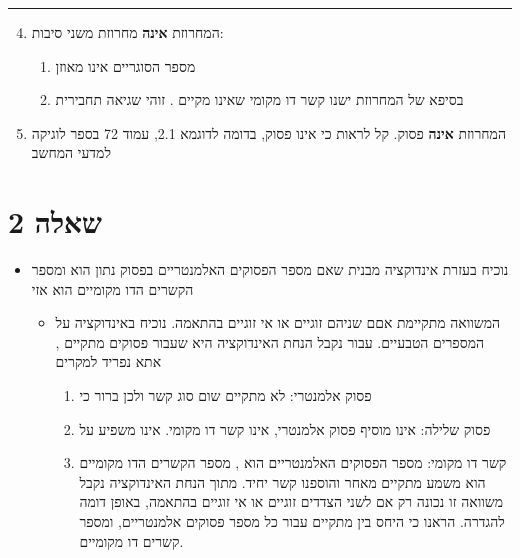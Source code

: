 \documentclass[
]{article}
\providecommand{\tightlist}{%
  \setlength{\itemsep}{0pt}\setlength{\parskip}{0pt}}
\begin{document}
\begin{center}\rule{0.5\linewidth}{0.5pt}\end{center}

\begin{enumerate}
\setcounter{enumi}{3}
\tightlist
\item
  המחרוזת {} \textbf{אינה} מחרוזת משני סיבות:

  \begin{enumerate}
  \tightlist
  \item
    מספר הסוגריים אינו מאוזן
  \item
    בסיפא של המחרוזת ישנו קשר דו מקומי שאינו מקיים {}. זוהי שגיאה
    תחבירית
  \end{enumerate}
\item
  המחרוזת {} \textbf{אינה} פסוק. קל לראות כי {} אינו פסוק, בדומה לדוגמא
  2.1, עמוד 72 בספר לוגיקה למדעי המחשב
\end{enumerate}

\section{שאלה 2}\label{ux5e9ux5d0ux5dcux5d4-2}

\begin{itemize}
\tightlist
\item
  נוכיח בעזרת אינדוקציה מבנית שאם מספר הפסוקים האלמנטריים בפסוק נתון הוא
  {} ומספר הקשרים הדו מקומיים הוא {} אזי {}

  \begin{itemize}
  \tightlist
  \item
    המשוואה {} מתקיימת אםם {} שניהם זוגיים או אי זוגיים בהתאמה. נוכיח
    באינדוקציה על המספרים הטבעיים. עבור {} נקבל {} הנחת האינדוקציה היא
    שעבור פסוקים {} מתקיים {}, {} אתא נפריד למקרים

    \begin{enumerate}
    \tightlist
    \item
      {} פסוק אלמנטרי: לא מתקיים שום סוג קשר ולכן ברור כי {}
    \item
      {} פסוק שלילה: אינו מוסיף פסוק אלמנטרי, אינו קשר דו מקומי. אינו
      משפיע על {}
    \item
      {} קשר דו מקומי: מספר הפסוקים האלמנטריים הוא {}, מספר הקשרים הדו
      מקומיים הוא {} משמע מתקיים {} מאחר והוספנו קשר יחיד. מתוך הנחת
      האינדוקציה נקבל {} משוואה זו נכונה רק אם לשני הצדדים זוגיים או אי
      זוגיים בהתאמה, באופן דומה להגדרה. הראנו כי היחס בין {} מתקיים עבור
      כל מספר פסוקים אלמנטריים, ומספר קשרים דו מקומיים.
    \end{enumerate}
  \end{itemize}
\end{itemize}
\end{document}

